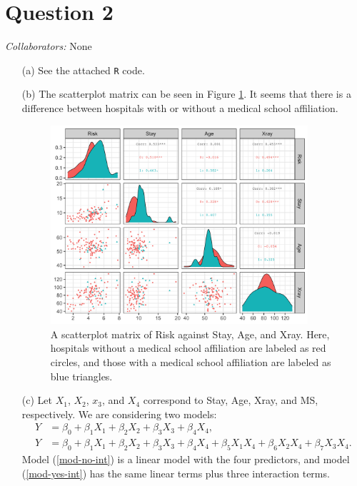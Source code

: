\documentclass[10pt]{article}
\newcommand{\mycolaba}[1]{\textcolor{colabcol}{\textsl{Collaborators:}} #1}
\begin{document}
\section{Question 2} \noindent
\mycolaba{None}
\begin{itemize}
    \item[(a)] See the attached \texttt{R} code.
    \item[(b)] The scatterplot matrix can be seen in Figure \ref{fig-q02-corr}. It seems that there is a difference between hospitals with or without 
    a medical school affiliation.
    \begin{figure}[ht]
        \centering
        \includegraphics[width = 0.9\textwidth]{img/q02-correlation.png}
        \caption{A scatterplot matrix of Risk against Stay, Age, and Xray. Here, hospitals without a medical school
        affiliation are labeled as red circles, and those with a medical school affiliation are labeled as blue triangles.}
        \label{fig-q02-corr}
    \end{figure}
    \item[(c)] Let \(X_1\), \(X_2\), \(x_3\), and \(X_4\) correspond to Stay, Age, Xray, and MS, respectively. We are considering two models:
    \begin{align}
        Y &= \beta_0 + \beta_1 X_1 + \beta_2 X_2 + \beta_3 X_3 + \beta_4 X_4, \label{mod-no-int}\\
        Y &= \beta_0 + \beta_1 X_1 + \beta_2 X_2 + \beta_3 X_3 + \beta_4 X_4 + \beta_5 X_1 X_4 + \beta_6 X_2 X_4 + \beta_7 X_3 X_4. \label{mod-yes-int}
    \end{align}
    Model (\ref{mod-no-int}) is a linear model with the four predictors, and model (\ref{mod-yes-int}) has the same linear terms plus three interaction terms. 

\end{itemize}
\end{document}

